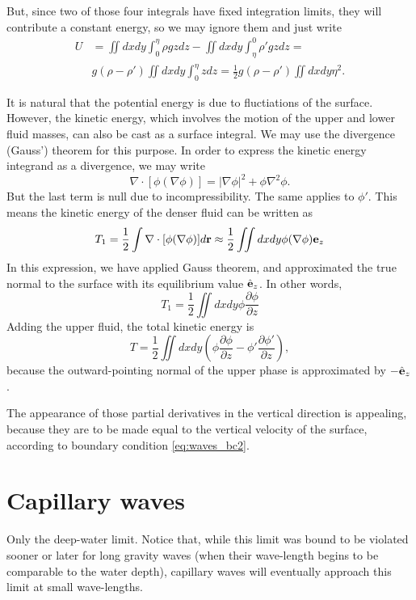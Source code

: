 But, since two of those four integrals have fixed integration limits,
they will contribute a constant energy, so we may ignore them and just
write
\begin{align*}
  U &=\iint dx dy   \int_{0}^\eta  \rho g z  dz   -
  \iint dx dy   \int_\eta^{0} \rho' g z dz = \\
  & g  (\rho-\rho')  \iint dx dy   \int_0^{\eta} z  dz =
  \frac 12 g  (\rho-\rho')  \iint dx dy \eta^2 .
\end{align*}

It is natural that the potential energy is due to fluctiations of the
surface. However, the kinetic energy, which involves the motion of the
upper and lower fluid masses, can also be cast as a surface integral.
We may use the divergence (Gauss') theorem for this purpose. In order
to express the kinetic energy integrand as a divergence, we may write
\[
  \nabla\cdot [ \phi (\nabla \phi) ]  =
  |\nabla \phi|^2 +
  \phi \nabla^2 \phi .
\]
But the last term is null due to incompressibility. The same applies
to $\phi'$. This means the kinetic energy of the denser fluid can be
written as
\[
  T_1 = \frac12 \int \nabla\cdot [ \phi (\nabla \phi) ] d\mathbf{r} \approx
  \frac12 \iint dx dy \phi (\nabla \phi) \mathbf{e}_z
\]
In this expression, we have applied Gauss theorem, and approximated
the true normal to the surface with its equilibrium value $\hat{\mathbf{e}}_z$.
In other words,
\[
  T_1 = 
  \frac12 \iint dx dy   \phi \frac{\partial \phi}{\partial z} 
\]
Adding the upper fluid, the total kinetic energy is
\[
  T = 
  \frac12 \iint dx dy
  \left(
    \phi \frac{\partial \phi}{\partial z}
    -
    \phi' \frac{\partial \phi'}{\partial z}
  \right) ,
\]
because the outward-pointing normal of the upper phase is
approximated by $-\hat{\mathbf{e}}_z$.

The appearance of those partial derivatives in the vertical direction
is appealing, because they are to be made equal to the vertical
velocity of the surface, according to boundary condition
\ref{eq:waves_bc2}.

\section{Capillary waves}

Only the deep-water limit. Notice that, while this limit was bound to
be violated sooner or later for long gravity waves (when their
wave-length begins to be comparable to the water depth), capillary
waves will eventually approach this limit at small wave-lengths.



